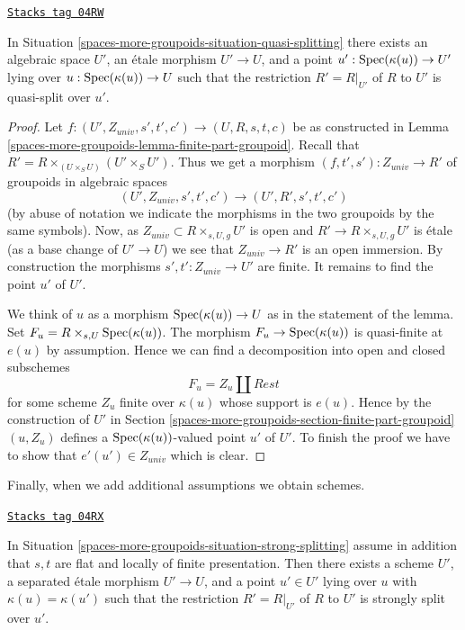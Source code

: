 \begin{lemma}

\label{spaces-more-groupoids-lemma-quasi-splitting}
\href{https://stacks.math.columbia.edu/tag/04RW}{\texttt{Stacks tag 04RW}}

In Situation \ref{spaces-more-groupoids-situation-quasi-splitting}
there exists an algebraic space $U'$, an \'etale morphism
$U' \to U$, and a point $u' : \operatorname{Spec}(\kappa(u)) \to U'$
lying over $u : \operatorname{Spec}(\kappa(u)) \to U$
such that the restriction $R' = R|_{U'}$ of $R$ to $U'$
is quasi-split over $u'$.
\end{lemma}

\begin{proof}
Let $f : (U', Z_{univ}, s', t', c') \to (U, R, s, t, c)$ be as constructed in
Lemma \ref{spaces-more-groupoids-lemma-finite-part-groupoid}.
Recall that $R' = R \times_{(U \times_S U)} (U' \times_S U')$.
Thus we get a morphism $(f, t', s') : Z_{univ} \to R'$ of groupoids
in algebraic spaces
$$
(U', Z_{univ}, s', t', c') \to (U', R', s', t', c')
$$
(by abuse of notation we indicate the morphisms in the two groupoids
by the same symbols). Now, as $Z_{univ} \subset R \times_{s, U, g} U'$ is open
and $R' \to R \times_{s, U, g} U'$ is \'etale (as a base change
of $U' \to U$) we see that $Z_{univ} \to R'$ is an open immersion.
By construction the morphisms $s', t' : Z_{univ} \to U'$ are finite.
It remains to find the point $u'$ of $U'$.

\medskip\noindent
We think of $u$ as a morphism $\operatorname{Spec}(\kappa(u)) \to U$ as in
the statement of the lemma. Set $F_u = R \times_{s, U} \operatorname{Spec}(\kappa(u))$.
The morphism $F_u \to \operatorname{Spec}(\kappa(u))$ is quasi-finite at $e(u)$
by assumption. Hence we can find a decomposition into open and closed
subschemes
$$
F_u = Z_u \amalg Rest
$$
for some scheme $Z_u$ finite over $\kappa(u)$ whose support is $e(u)$.
Hence by the construction of $U'$ in
Section \ref{spaces-more-groupoids-section-finite-part-groupoid}
$(u, Z_u)$ defines a $\operatorname{Spec}(\kappa(u))$-valued
point $u'$ of $U'$. To finish the proof we have to show that
$e'(u') \in Z_{univ}$ which is clear.
\end{proof}

Finally, when we add additional assumptions we obtain schemes.

\begin{lemma}
\label{spaces-more-groupoids-lemma-strong-splitting-scheme}
\href{https://stacks.math.columbia.edu/tag/04RX}{\texttt{Stacks tag 04RX}}

In Situation \ref{spaces-more-groupoids-situation-strong-splitting} assume in addition that
$s, t$ are flat and locally of finite presentation.
Then there exists a scheme $U'$, a separated \'etale morphism
$U' \to U$, and a point $u' \in U'$
lying over $u$ with $\kappa(u) = \kappa(u')$
such that the restriction $R' = R|_{U'}$ of $R$ to $U'$
is strongly split over $u'$.
\end{lemma}

